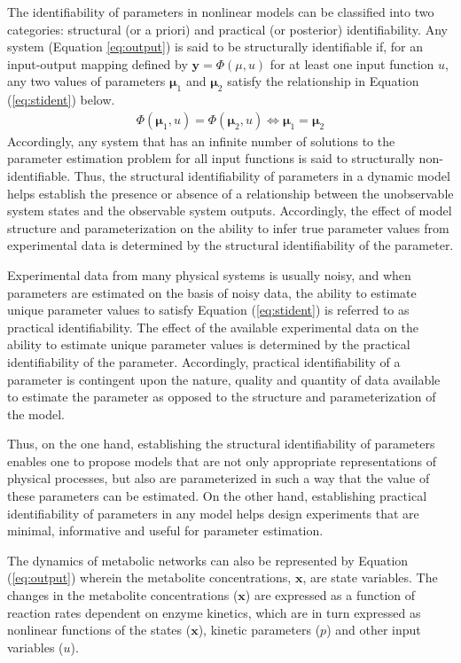 \documentclass[10pt]{article}
\begin{document}
The identifiability of parameters in nonlinear models can be classified into two categories: structural (or a priori) and practical (or posterior) identifiability. 	
Any system (Equation \ref{eq:output}) is said to be structurally identifiable if, for an input-output mapping defined by $\mathbf{y} = \Phi(\mu,u)$ for at least one input function $u$, any two values of parameters $\mathbf{\mu}_1$ and $\mathbf{\mu}_2$ satisfy the relationship in Equation (\ref{eq:stident}) below.
\begin{align}\label{eq:stident}
\Phi(\mathbf{\mu}_1,u) = \Phi(\mathbf{\mu}_2,u) \iff \mathbf{\mu}_1 = \mathbf{\mu}_2
\end{align}
Accordingly, any system that has an infinite number of solutions to the parameter estimation problem for all input functions is said to structurally non-identifiable. Thus, the structural identifiability of parameters in a dynamic model helps establish the presence or absence of a relationship between the unobservable system states and the observable system outputs. Accordingly, the effect of model structure and parameterization on the ability to infer true parameter values from experimental data is determined by the structural identifiability of the parameter. 

Experimental data from many physical systems is usually noisy, and when parameters are estimated on the basis of noisy data, the ability to estimate unique parameter values to satisfy Equation (\ref{eq:stident}) is referred to as practical identifiability. The effect of the available experimental data on the ability to estimate unique parameter values is determined by the practical identifiability of the parameter. Accordingly, practical identifiability of a parameter is contingent upon the nature, quality and quantity of data available to estimate the parameter as opposed to the structure and parameterization of the model. 

Thus, on the one hand, establishing the structural identifiability of parameters enables one to propose models that are not only appropriate representations of physical processes, but also are parameterized in such a way that the value of these parameters can be estimated. On the other hand, establishing practical identifiability of parameters in any model helps design experiments that are minimal, informative and useful for parameter estimation.

The dynamics of metabolic networks can also be represented by Equation (\ref{eq:output}) wherein the metabolite concentrations, $\mathbf{x}$, are state variables. The changes in the metabolite concentrations ($\mathbf{x}$) are expressed as a function of reaction rates dependent on enzyme kinetics, which are in turn expressed as nonlinear functions of the states ($\mathbf{x}$), kinetic parameters ($p$) and other input variables ($u$). 
\end{document}
